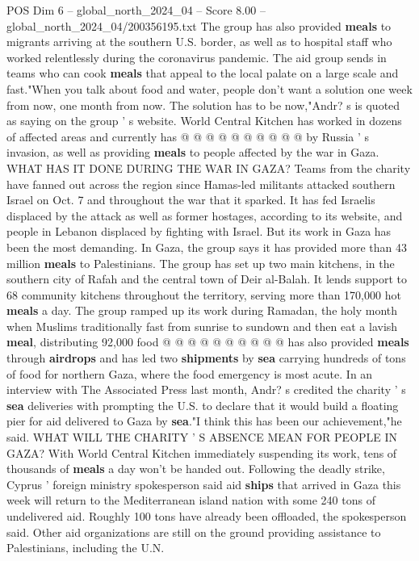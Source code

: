 \begin{textsample}{POS Dim 6 – global\_north\_2024\_04 – Score 8.00 – global\_north\_2024\_04/200356195.txt}
The group has also provided \textbf{meals} to migrants arriving at the southern U.S. border, as well as to hospital staff who worked relentlessly during the coronavirus pandemic.
The aid group sends in teams who can cook \textbf{meals} that appeal to the local palate on a large scale and fast."When you talk about food and water, people don't want a solution one week from now, one month from now.
The solution has to be now,"Andr? s is quoted as saying on the group ' s website.
World Central Kitchen has worked in dozens of affected areas and currently has @ @ @ @ @ @ @ @ @ @ by Russia ' s invasion, as well as providing \textbf{meals} to people affected by the war in Gaza.
WHAT HAS IT DONE DURING THE WAR IN GAZA?
Teams from the charity have fanned out across the region since Hamas-led militants attacked southern Israel on Oct. 7 and throughout the war that it sparked.
It has fed Israelis displaced by the attack as well as former hostages, according to its website, and people in Lebanon displaced by fighting with Israel.
But its work in Gaza has been the most demanding.
In Gaza, the group says it has provided more than 43 million \textbf{meals} to Palestinians.
The group has set up two main kitchens, in the southern city of Rafah and the central town of Deir al-Balah.
It lends support to 68 community kitchens throughout the territory, serving more than 170,000 hot \textbf{meals} a day.
The group ramped up its work during Ramadan, the holy month when Muslims traditionally fast from sunrise to sundown and then eat a lavish \textbf{meal}, distributing 92,000 food @ @ @ @ @ @ @ @ @ @ has also provided \textbf{meals} through \textbf{airdrops} and has led two \textbf{shipments} by \textbf{sea} carrying hundreds of tons of food for northern Gaza, where the food emergency is most acute.
In an interview with The Associated Press last month, Andr? s credited the charity ' s \textbf{sea} deliveries with prompting the U.S. to declare that it would build a floating pier for aid delivered to Gaza by \textbf{sea}."I think this has been our achievement,"he said.
WHAT WILL THE CHARITY ' S ABSENCE MEAN FOR PEOPLE IN GAZA?
With World Central Kitchen immediately suspending its work, tens of thousands of \textbf{meals} a day won't be handed out.
Following the deadly strike, Cyprus ' foreign ministry spokesperson said aid \textbf{ships} that arrived in Gaza this week will return to the Mediterranean island nation with some 240 tons of undelivered aid.
Roughly 100 tons have already been offloaded, the spokesperson said.
Other aid organizations are still on the ground providing assistance to Palestinians, including the U.N.

\end{textsample}
